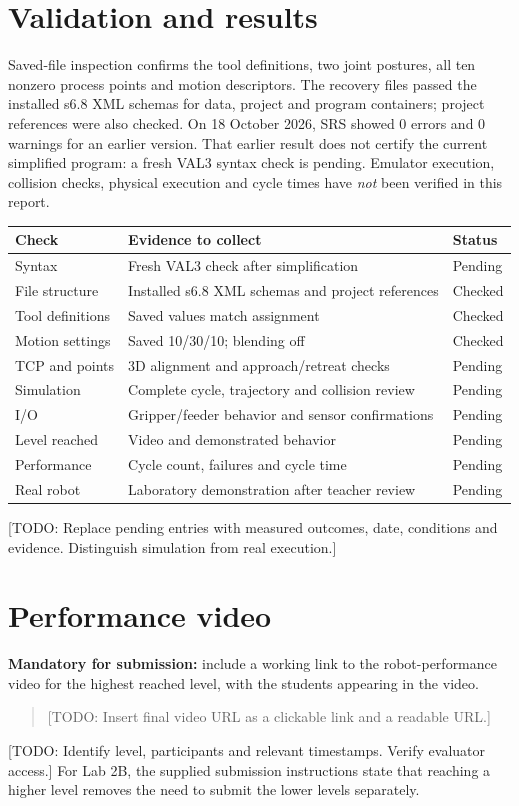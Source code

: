 \documentclass[12pt]{article}
\newcommand{\pending}[1]{\textcolor{blue!65!black}{[TODO: #1]}}
\begin{document}
\section{Validation and results}
Saved-file inspection confirms the tool definitions, two joint postures, all ten nonzero process points and motion descriptors. The recovery files passed the installed s6.8 XML schemas for data, project and program containers; project references were also checked. On 18 October 2026, SRS showed 0 errors and 0 warnings for an earlier version. That earlier result does not certify the current simplified program: a fresh VAL3 syntax check is pending. Emulator execution, collision checks, physical execution and cycle times have \emph{not} been verified in this report.

\begin{tabularx}{\linewidth}{@{}l X l@{}}
\toprule
Check & Evidence to collect & Status\\
\midrule
Syntax & Fresh VAL3 check after simplification & Pending\\
File structure & Installed s6.8 XML schemas and project references & Checked\\
Tool definitions & Saved values match assignment & Checked\\
Motion settings & Saved 10/30/10; blending off & Checked\\
TCP and points & 3D alignment and approach/retreat checks & Pending\\
Simulation & Complete cycle, trajectory and collision review & Pending\\
I/O & Gripper/feeder behavior and sensor confirmations & Pending\\
Level reached & Video and demonstrated behavior & Pending\\
Performance & Cycle count, failures and cycle time & Pending\\
Real robot & Laboratory demonstration after teacher review & Pending\\
\bottomrule
\end{tabularx}
\pending{Replace pending entries with measured outcomes, date, conditions and evidence. Distinguish simulation from real execution.}

\section{Performance video}
\textbf{Mandatory for submission:} include a working link to the robot-performance video for the highest reached level, with the students appearing in the video.
\begin{quote}
\pending{Insert final video URL as a clickable link and a readable URL.}
\end{quote}
\pending{Identify level, participants and relevant timestamps. Verify evaluator access.}
For Lab 2B, the supplied submission instructions state that reaching a higher level removes the need to submit the lower levels separately.
\end{document}
